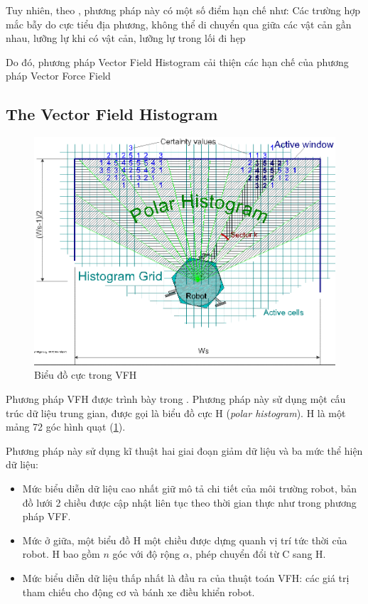 Tuy nhiên, theo \cite{Koren1991}, phương pháp này có một số điểm hạn chế như: Các trường hợp mắc bẫy do cực tiểu địa phương, không thể di chuyển qua giữa các vật cản gần nhau, lưỡng lự khi có vật cản, lưỡng lự trong lối đi hẹp

Do đó, phương pháp Vector Field Histogram cải thiện các hạn chế của phương pháp Vector Force Field

\subsection{The Vector Field Histogram}
\label{sub:VFH}

\begin{figure}[htbp]
  \centering
  \includegraphics[width=0.6\linewidth]{figures/VFH-PolarHistogram.png}
  \caption{Biểu đồ cực trong VFH}
  \label{fig:PolarHistogram}
\end{figure}

Phương pháp VFH được trình bày trong \cite{Borenstein1991}. Phương pháp này sử dụng một cấu trúc dữ liệu trung gian, được gọi là biểu đồ cực H (\textit{polar histogram}). H là một mảng 72 góc hình quạt (\figurename{\ref{fig:PolarHistogram}}).

Phương pháp này sử dụng kĩ thuật hai giai đoạn giảm dữ liệu và ba mức thể hiện dữ liệu:

\begin{itemize}
  \item Mức biểu diễn dữ liệu cao nhất giữ mô tả chi tiết của môi trường robot, bản đồ lưới 2 chiều được cập nhật liên tục theo thời gian thực như trong phương pháp VFF.
  \item Mức ở giữa, một biểu đồ H một chiều được dựng quanh vị trí tức thời của robot. H bao gồm $n$ góc với độ rộng $\alpha$, phép chuyển đổi từ C sang H.
  \item Mức biểu diễn dữ liệu thấp nhất là đầu ra của thuật toán VFH: các giá trị tham chiếu cho động cơ và bánh xe điều khiển robot.
\end{itemize}

